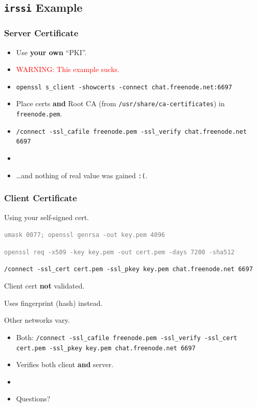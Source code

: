 \documentclass[xcolor={dvipsnames,svgnames},hyperref=dvips]{beamer}
\begin{document}
\subsection{\texttt{irssi} Example}
	\begin{frame}
		\frametitle{Server Certificate}
		\begin{itemize}
		\item Use \textbf{your own} ``PKI''.
		\item \textcolor{red}{WARNING: This example sucks.}
		\item \texttt{openssl s\_client -showcerts -connect chat.freenode.net:6697}
		\item Place certs \textbf{and} Root CA (from \texttt{/usr/share/ca-certificates}) in \texttt{freenode.pem}.
		\item \texttt{/connect -ssl\_cafile freenode.pem -ssl\_verify chat.freenode.net 6697}
		\item[]
		\item \ldots and nothing of real value was gained \texttt{:(}.
		\end{itemize}
	\end{frame}

	\begin{frame}
		\frametitle{Client Certificate}
		\begin{itemize}
		\item Using your self-signed cert.
		\textcolor{gray}{\item \texttt{umask 0077; openssl genrsa -out key.pem 4096}}
		\textcolor{gray}{\item \texttt{openssl req -x509 -key key.pem -out cert.pem -days 7200 -sha512}}
		\item \texttt{/connect -ssl\_cert cert.pem -ssl\_pkey key.pem chat.freenode.net 6697}
		\item Client cert \textbf{not} validated.
		\item Uses fingerprint (hash) instead.
		\item Other networks vary.
		\end{itemize}
	\end{frame}

	\begin{frame}
		\begin{itemize}
		\item Both: \texttt{/connect -ssl\_cafile freenode.pem -ssl\_verify -ssl\_cert cert.pem -ssl\_pkey key.pem chat.freenode.net 6697}
		\item Verifies both client \textbf{and} server.
		\item []
		\item Questions?
		\end{itemize}
	\end{frame}
\end{document}
